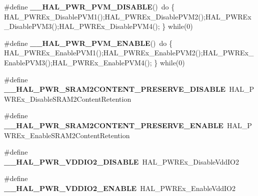 \begin{DoxyCompactItemize}
\item 
\hypertarget{group___h_a_l___p_w_r___aliased___macros_gaec66f2306538bb9002387ceafeb38462}{\#define {\bfseries \-\_\-\-\_\-\-H\-A\-L\-\_\-\-P\-W\-R\-\_\-\-P\-V\-M\-\_\-\-D\-I\-S\-A\-B\-L\-E}()~do \{ H\-A\-L\-\_\-\-P\-W\-R\-Ex\-\_\-\-Disable\-P\-V\-M1();H\-A\-L\-\_\-\-P\-W\-R\-Ex\-\_\-\-Disable\-P\-V\-M2();H\-A\-L\-\_\-\-P\-W\-R\-Ex\-\_\-\-Disable\-P\-V\-M3();H\-A\-L\-\_\-\-P\-W\-R\-Ex\-\_\-\-Disable\-P\-V\-M4(); \} while(0)}\label{group___h_a_l___p_w_r___aliased___macros_gaec66f2306538bb9002387ceafeb38462}

\item 
\hypertarget{group___h_a_l___p_w_r___aliased___macros_ga48b28ca62d86e12f33848cbb20ea16dc}{\#define {\bfseries \-\_\-\-\_\-\-H\-A\-L\-\_\-\-P\-W\-R\-\_\-\-P\-V\-M\-\_\-\-E\-N\-A\-B\-L\-E}()~do \{ H\-A\-L\-\_\-\-P\-W\-R\-Ex\-\_\-\-Enable\-P\-V\-M1();H\-A\-L\-\_\-\-P\-W\-R\-Ex\-\_\-\-Enable\-P\-V\-M2();H\-A\-L\-\_\-\-P\-W\-R\-Ex\-\_\-\-Enable\-P\-V\-M3();H\-A\-L\-\_\-\-P\-W\-R\-Ex\-\_\-\-Enable\-P\-V\-M4(); \} while(0)}\label{group___h_a_l___p_w_r___aliased___macros_ga48b28ca62d86e12f33848cbb20ea16dc}

\item 
\hypertarget{group___h_a_l___p_w_r___aliased___macros_ga3cd8ad30e5e9e533d0a60fecfc541f03}{\#define {\bfseries \-\_\-\-\_\-\-H\-A\-L\-\_\-\-P\-W\-R\-\_\-\-S\-R\-A\-M2\-C\-O\-N\-T\-E\-N\-T\-\_\-\-P\-R\-E\-S\-E\-R\-V\-E\-\_\-\-D\-I\-S\-A\-B\-L\-E}~H\-A\-L\-\_\-\-P\-W\-R\-Ex\-\_\-\-Disable\-S\-R\-A\-M2\-Content\-Retention}\label{group___h_a_l___p_w_r___aliased___macros_ga3cd8ad30e5e9e533d0a60fecfc541f03}

\item 
\hypertarget{group___h_a_l___p_w_r___aliased___macros_ga6e94fe92e8c944021c1a82cc9ab4b977}{\#define {\bfseries \-\_\-\-\_\-\-H\-A\-L\-\_\-\-P\-W\-R\-\_\-\-S\-R\-A\-M2\-C\-O\-N\-T\-E\-N\-T\-\_\-\-P\-R\-E\-S\-E\-R\-V\-E\-\_\-\-E\-N\-A\-B\-L\-E}~H\-A\-L\-\_\-\-P\-W\-R\-Ex\-\_\-\-Enable\-S\-R\-A\-M2\-Content\-Retention}\label{group___h_a_l___p_w_r___aliased___macros_ga6e94fe92e8c944021c1a82cc9ab4b977}

\item 
\hypertarget{group___h_a_l___p_w_r___aliased___macros_ga61f85ad4cd0958d67c8cf027a1b67da5}{\#define {\bfseries \-\_\-\-\_\-\-H\-A\-L\-\_\-\-P\-W\-R\-\_\-\-V\-D\-D\-I\-O2\-\_\-\-D\-I\-S\-A\-B\-L\-E}~H\-A\-L\-\_\-\-P\-W\-R\-Ex\-\_\-\-Disable\-Vdd\-I\-O2}\label{group___h_a_l___p_w_r___aliased___macros_ga61f85ad4cd0958d67c8cf027a1b67da5}

\item 
\hypertarget{group___h_a_l___p_w_r___aliased___macros_ga0dabc2d8d35163d52c02fcbd04fd14a6}{\#define {\bfseries \-\_\-\-\_\-\-H\-A\-L\-\_\-\-P\-W\-R\-\_\-\-V\-D\-D\-I\-O2\-\_\-\-E\-N\-A\-B\-L\-E}~H\-A\-L\-\_\-\-P\-W\-R\-Ex\-\_\-\-Enable\-Vdd\-I\-O2}\label{group___h_a_l___p_w_r___aliased___macros_ga0dabc2d8d35163d52c02fcbd04fd14a6}


\end{DoxyCompactItemize}
